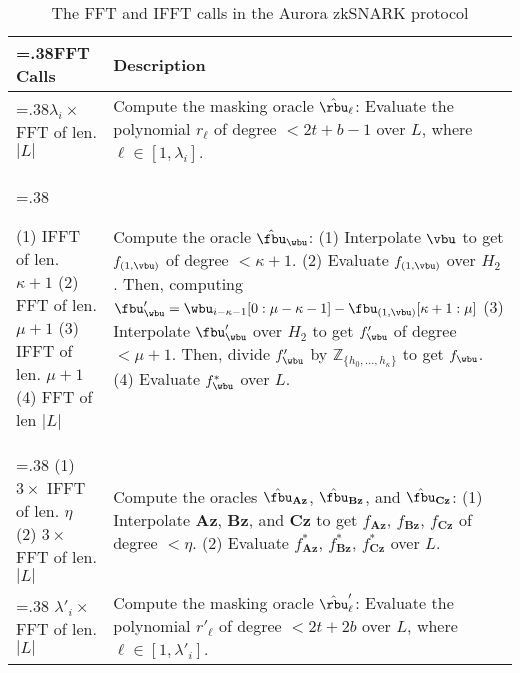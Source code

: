 \vspace{-2em}
\begin{table}
	\centering
	\caption{ The FFT and IFFT calls in the Aurora zkSNARK protocol}
	{
		\label{tab:fftcalls}
		\begin{tabularx}{\linewidth}{>{\hsize=.38\hsize}XX}
			\toprule
			\textbf{FFT Calls} & \textbf{Description} \\
			\midrule
			$\lambda_i \times$ FFT of len. $|L|$ & Compute the masking oracle $\hat{\rbu}_\ell$: Evaluate the polynomial $r_\ell$ of degree $<2t+b-1$ over $L$, where $\ell \in [1,\lambda_i]$. \\
			\midrule
			
			(1) IFFT of len. $\kappa + 1$\newline
			(2) FFT of len. $\mu + 1$\newline
			(3) IFFT of len. $\mu + 1$\newline
			(4) FFT of len $|L|$
			& Compute the oracle $\hat{\fbu}_\wbu$: \newline
			(1) Interpolate $\vbu$ to get $f_{(1,\vbu)}$ of degree $<\kappa + 1$. \newline
			(2) Evaluate $f_{(1,\vbu)}$ over $H_2$. \newline 
			Then, computing $\fbu'_\wbu = {\wbu_{i-\kappa-1}[0:\mu-\kappa - 1] - \fbu_{(1,\vbu)}[\kappa+1:\mu]}$ \newline
			(3) Interpolate $\fbu'_\wbu$ over $H_2$ to get $f'_\wbu$ of degree $< \mu + 1$. \newline
			Then, divide $f'_\wbu$ by $\mathbb{Z}_{\{h_0,\dots, h_{\kappa}\}}$ to get $f_\wbu$.\newline
			(4) Evaluate $f_\wbu^*$ over $L$.
			\\
			\midrule
			(1) $3 \times$ IFFT of len. $\eta$\newline
			(2) $3 \times$ FFT of len. $|L|$
			&
			Compute the oracles $\hat{\fbu}_{\mathbf{Az}}$, $\hat{\fbu}_{\mathbf{Bz}}$, and $\hat{\fbu}_{\mathbf{Cz}}$:\newline
			(1) Interpolate $\mathbf{Az}$, $\mathbf{Bz}$, and $\mathbf{Cz}$ to get $f_\mathbf{Az}$, $f_\mathbf{Bz}$, $f_\mathbf{Cz}$ of degree $<\eta$.\newline
			(2) Evaluate $f_\mathbf{Az}^*$, $f_\mathbf{Bz}^*$, $f_\mathbf{Cz}^*$ over $L$.
			\\
			\midrule
			$\lambda'_i \times$ FFT of len. $|L|$ & Compute the masking oracle $\hat{\rbu}'_\ell$: Evaluate the polynomial $r'_\ell$ of degree $<2t+2b$ over $L$, where $\ell \in [1,\lambda'_i]$. \\

\end{tabularx}}
\end{table}
